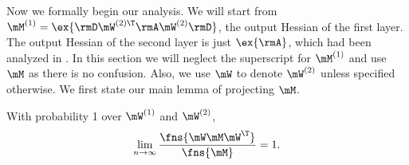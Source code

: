 Now we formally begin our analysis. We will start from $\mM^{(1)}=\ex{\rmD\mW^{(2)\T}\rmA\mW^{(2)}\rmD}$, the output Hessian of the first layer. The output Hessian of the second layer is just $\ex{\rmA}$, which had been analyzed in . In this section we will neglect the superscript for $\mM^{(1)}$ and use $\mM$ as there is no confusion. Also, we use $\mW$ to denote $\mW^{(2)}$ unless specified otherwise. We first state our main lemma of projecting $\mM$. 

\begin{lemma}
\label{lemma:M-proj-preserve-f-norm}
With probability 1 over $\mW^{(1)}$ and $\mW^{(2)}$, \begin{equation}
    \lim_{n\to\infty}\frac{\fns{\mW\mM\mW^\T}}{\fns{\mM}}=1.
\end{equation}
\end{lemma}
